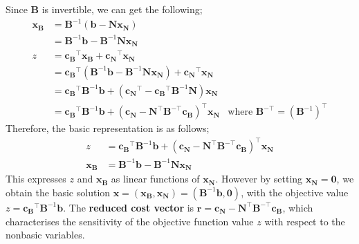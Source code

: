 \documentclass[a4paper, 12pt]{article}
\newcommand{\mat}[1]{\boldsymbol{#1}}
\renewcommand{\vec}[1]{\boldsymbol{#1}}
\begin{document}
                Since $\mat{B}$ is invertible, we can get the following;
                \begin{align*}
                    \vec{x_B} & = \mat{B}^{-1}(\vec{b} - \mat{N}\vec{x_N}) \\
                    & = \mat{B}^{-1}\vec{b} - \mat{B}^{-1}\mat{N}\vec{x_N} \\
                    z & = \vec{c_B}^\top\vec{x_B} + \vec{c_N}^\top\vec{x_N} \\
                    & = \vec{c_B}^\top(\mat{B}^{-1}\vec{b} - \mat{B}^{-1}\mat{N}\vec{x_N}) + \vec{c_N}^\top\vec{x_N} \\
                    & = \vec{c_B}^\top\mat{B}^{-1}\vec{b} + (\vec{c_N}^\top - \vec{c_B}^\top\mat{B}^{-1}\mat{N})\vec{x_N} \\
                    & = \vec{c_B}^\top\mat{B}^{-1}\vec{b} + (\vec{c_N} - \mat{N}^\top\mat{B}^{-\top}\vec{c_B})^\top\vec{x_N} & \text{where } \mat{B}^{-\top} = (\mat{B}^{-1})^\top
                \end{align*}
                Therefore, the basic representation is as follows;
                \begin{align*}
                    z & = \vec{c_B}^\top\mat{B}^{-1}\vec{b} + (\vec{c_N} - \mat{N}^\top\mat{B}^{-\top}\vec{c_B})^\top\vec{x_N} \\
                    \vec{x_B} & = \mat{B}^{-1}\vec{b} - \mat{B}^{-1}\mat{N}\vec{x_N}
                \end{align*}
                This expresses $z$ and $\vec{x_B}$ as linear functions of $\vec{x_N}$.
                However by setting $\vec{x_N} = \vec{0}$, we obtain the basic solution $\vec{x} = (\vec{x_B}, \vec{x_N}) = (\mat{B}^{-1}\vec{b}, \vec{0})$, with the objective value $z = \vec{c_B}^\top\mat{B}^{-1}\vec{b}$.
                The \textbf{reduced cost vector} is $\vec{r} = \vec{c_N} - \mat{N}^\top\mat{B}^{-\top}\vec{c_B}$, which characterises the sensitivity of the objective function value $z$ with respect to the nonbasic variables.
                \medskip
\end{document}
